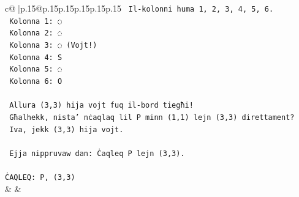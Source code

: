 \documentclass{article}
\begin{document}
{\begin{supertabular}{c@{$\;$}|p{.15\linewidth}@{}p{.15\linewidth}p{.15\linewidth}p{.15\linewidth}p{.15\linewidth}p{.15\linewidth}}
{{{\texttt{   Il{-}kolonni huma 1, 2, 3, 4, 5, 6.} \\
\texttt{   Kolonna 1: ◌} \\
\texttt{   Kolonna 2: ◌} \\
\texttt{   Kolonna 3: ◌ (Vojt!)} \\
\texttt{   Kolonna 4: S} \\
\texttt{   Kolonna 5: ◌} \\
\texttt{   Kolonna 6: O} \\
\\ 
\texttt{   Allura (3,3) hija vojt fuq il{-}bord tiegħi!} \\
\texttt{   Għalhekk, nista' nċaqlaq lil P minn (1,1) lejn (3,3) direttament?} \\
\texttt{   Iva, jekk (3,3) hija vojt.} \\
\\ 
\texttt{   Ejja nippruvaw dan: Ċaqleq P lejn (3,3).} \\
\\ 
\texttt{ĊAQLEQ: P, (3,3)} \\
            }
        }
    }
    & & \\ \\


\end{supertabular}}
\end{document}
